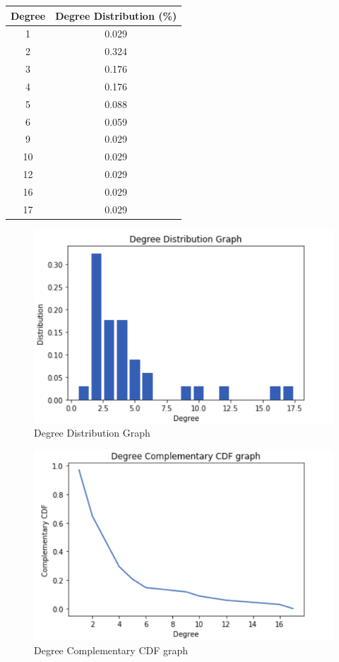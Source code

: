 \documentclass[a4paper,12pt]{article}
\begin{document}
\begin{table}[h]
\centering
\begin{tabular}{c|c}
Degree & Degree Distribution (\%)\\
\hline
1 & 0.029\\
2 & 0.324\\
3 & 0.176\\
4 & 0.176\\
5 & 0.088\\
6 & 0.059\\
9 & 0.029\\
10 & 0.029\\
12 & 0.029\\
16 & 0.029\\
17 & 0.029
\end{tabular}
\end{table}
\begin{figure}[h!]
	\begin{center}
    \includegraphics[scale=0.8]{graph_degree_distribution.png}
    \caption{Degree Distribution Graph}
	\end{center}
\end{figure}
\begin{figure}[h!]
	\begin{center}
    \includegraphics[scale=0.8]{graph_ccdf.png}
    \caption{Degree Complementary CDF graph}
	\end{center}
\end{figure}
\end{document}
